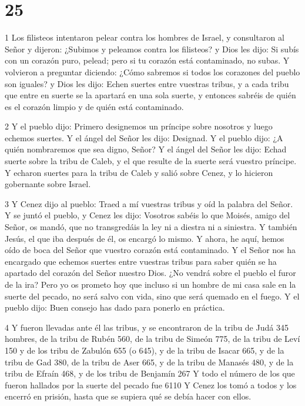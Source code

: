 \chapter{25}

\par 1 Los filisteos intentaron pelear contra los hombres de Israel, y consultaron al Señor y dijeron: ¿Subimos y peleamos contra los filisteos? y Dios les dijo: Si subís con un corazón puro, pelead; pero si tu corazón está contaminado, no subas. Y volvieron a preguntar diciendo: ¿Cómo sabremos si todos los corazones del pueblo son iguales? y Dios les dijo: Echen suertes entre vuestras tribus, y a cada tribu que entre en suerte se la apartará en una sola suerte, y entonces sabréis de quién es el corazón limpio y de quién está contaminado.

\par 2 Y el pueblo dijo: Primero designemos un príncipe sobre nosotros y luego echemos suertes. Y el ángel del Señor les dijo: Designad. Y el pueblo dijo: ¿A quién nombraremos que sea digno, Señor? Y el ángel del Señor les dijo: Echad suerte sobre la tribu de Caleb, y el que resulte de la suerte será vuestro príncipe. Y echaron suertes para la tribu de Caleb y salió sobre Cenez, y lo hicieron gobernante sobre Israel.

\par 3 Y Cenez dijo al pueblo: Traed a mí vuestras tribus y oíd ​​la palabra del Señor. Y se juntó el pueblo, y Cenez les dijo: Vosotros sabéis lo que Moisés, amigo del Señor, os mandó, que no transgredáis la ley ni a diestra ni a siniestra. Y también Jesús, el que iba después de él, os encargó lo mismo. Y ahora, he aquí, hemos oído de boca del Señor que vuestro corazón está contaminado. Y el Señor nos ha encargado que echemos suertes entre vuestras tribus para saber quién se ha apartado del corazón del Señor nuestro Dios. ¿No vendrá sobre el pueblo el furor de la ira? Pero yo os prometo hoy que incluso si un hombre de mi casa sale en la suerte del pecado, no será salvo con vida, sino que será quemado en el fuego. Y el pueblo dijo: Buen consejo has dado para ponerlo en práctica.

\par 4 Y fueron llevadas ante él las tribus, y se encontraron de la tribu de Judá 345 hombres, de la tribu de Rubén 560, de la tribu de Simeón 775, de la tribu de Leví 150 y de los tribu de Zabulón 655 (o 645), y de la tribu de Isacar 665, y de la tribu de Gad 380, de la tribu de Aser 665, y de la tribu de Manasés 480, y de la tribu de Efraín 468, y de los tribu de Benjamín 267 Y todo el número de los que fueron hallados por la suerte del pecado fue 6110 Y Cenez los tomó a todos y los encerró en prisión, hasta que se supiera qué se debía hacer con ellos.

